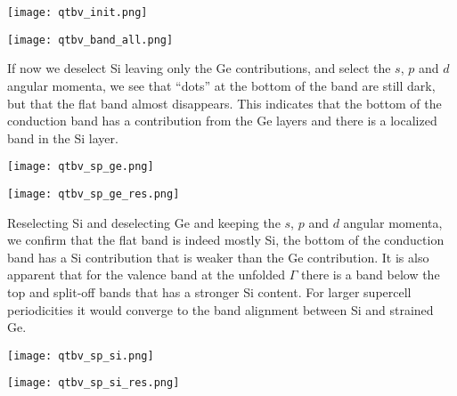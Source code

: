 \documentclass[11pt]{article}
\begin{document}
\begin{minipage}[b]{0.35\columnwidth}
   \texttt{[image: qtbv\_init.png]}
\end{minipage}\columnwidth
\begin{minipage}[b]{0.60\columnwidth}
    \texttt{[image: qtbv\_band\_all.png]}
\end{minipage}

If now we deselect Si leaving only the Ge contributions, and select the $s$, $p$ and $d$ angular momenta,
we see that ``dots'' at the bottom of the band are still dark, but that the flat band almost disappears.
This indicates that the bottom of the conduction band has a contribution from the Ge layers
and there is a localized band in the Si layer.

\begin{minipage}[b]{0.35\columnwidth}
   \texttt{[image: qtbv\_sp\_ge.png]}
\end{minipage}\columnwidth
\begin{minipage}[b]{0.60\columnwidth}
    \texttt{[image: qtbv\_sp\_ge\_res.png]}
\end{minipage}

Reselecting Si and deselecting Ge and keeping the $s$, $p$ and $d$ angular momenta,
we confirm that the flat band is indeed mostly Si, the bottom of the conduction
band has a Si contribution that is weaker than the Ge contribution.
It is also apparent that for the valence band at the unfolded $\Gamma$
there is a band below the top and split-off bands that has a stronger
Si content.  For larger supercell periodicities it would converge to the band
alignment between Si and strained Ge.


\begin{minipage}[b]{0.35\columnwidth}
   \texttt{[image: qtbv\_sp\_si.png]}
\end{minipage}\columnwidth
\begin{minipage}[b]{0.60\columnwidth}
    \texttt{[image: qtbv\_sp\_si\_res.png]}
\end{minipage}
\end{document}

